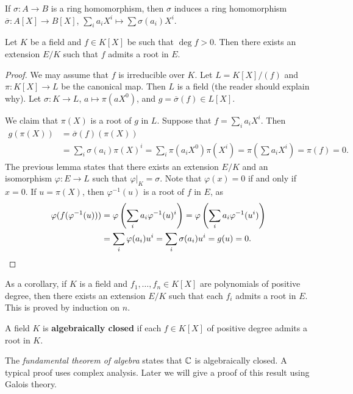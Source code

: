 If $\sigma\colon A\to B$ is a ring homomorphism, then $\sigma$ induces a ring
homomorphism $\overline{\sigma}\colon A[X]\to B[X]$,
$\sum_ia_iX^i\mapsto\sum\sigma(a_i)X^i$. 

\begin{theorem}
	Let $K$ be a field and $f\in K[X]$ be such that $\deg f>0$. Then 
	there exists an extension $E/K$ such that $f$ admits a root in $E$. 
\end{theorem}

\begin{proof}
	We may assume that $f$ is irreducible over $K$. Let $L=K[X]/(f)$ and 
	$\pi\colon K[X]\to L$ be the canonical map. Then $L$ 
	is a field (the reader should explain why). 
	Let $\sigma\colon K\to L$, $a\mapsto \pi(aX^0)$, and 
	$g=\overline{\sigma}(f)\in L[X]$. 

	We claim that $\pi(X)$ is a root of $g$ in $L$. Suppose that $f=\sum_i a_iX^i$. 
	Then 
	\begin{align*}
		g(\pi(X))&=\overline{\sigma}(f)(\pi(X))\\
		&=\sum_i \sigma(a_i)\pi(X)^i
		=\sum_i\pi(a_iX^0)\pi(X^i)=\pi(\sum a_iX^i)=\pi(f)=0.
	\end{align*}
	The previous lemma states that 
	there exists an extension $E/K$ and an isomorphism $\varphi\colon E\to L$
	such that $\varphi|_K=\sigma$. Note that
	$\varphi(x)=0$ if and only if $x=0$. If $u=\pi(X)$, then $\varphi^{-1}(u)$ is a root of $f$ in $E$, 
	as 
	\begin{align*}
		\varphi(f(\varphi^{-1}(u)))&=\varphi\left(\sum_ia_i\varphi^{-1}(u)^i\right)
		=\varphi\left(\sum_ia_i\varphi^{-1}(u^i)\right)\\
		&=\sum_i\varphi(a_i)u^i=\sum_i\sigma(a_i)u^i=g(u)=0.\qedhere
	\end{align*}
\end{proof}

As a corollary, if $K$ is a field and $f_1,\dots,f_n\in K[X]$ are polynomials 
of positive degree, then there exists an extension $E/K$  such that 
each $f_i$ admits a root in $E$. This is proved by induction on $n$.  

\begin{definition}
	A field $K$ is \textbf{algebraically closed} if each $f\in K[X]$ 
	of positive degree admits a root in $K$. 
\end{definition}

The \emph{fundamental theorem of algebra} states that $\mathbb{C}$ is algebraically closed. A
typical proof uses complex analysis.  Later we will give a proof of this result
using Galois theory. 

